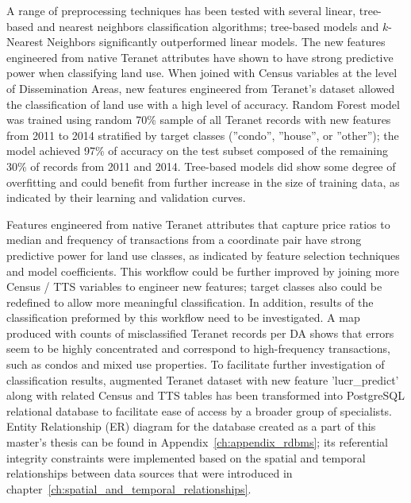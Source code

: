 A range of preprocessing techniques has been tested with several linear, tree-based and nearest neighbors classification algorithms;
tree-based models and $k$-Nearest Neighbors significantly outperformed linear models.
The new features engineered from native Teranet attributes have shown to have strong predictive power when classifying land use.
When joined with Census variables at the level of Dissemination Areas, new features engineered from Teranet's dataset allowed the classification of land use with a high level of accuracy.
Random Forest model was trained using random 70\% sample of all Teranet records with new features from 2011 to 2014 stratified by target classes (''condo'', ''house'', or ''other'');
the model achieved 97\% of accuracy on the test subset composed of the remaining 30\% of records from 2011 and 2014.
Tree-based models did show some degree of overfitting and could benefit from further increase in the size of training data, as indicated by their learning and validation curves.

Features engineered from native Teranet attributes that capture price ratios to median and frequency of transactions from a coordinate pair have strong predictive power for land use classes, as indicated by feature selection techniques and model coefficients.
This workflow could be further improved by joining more Census / TTS variables to engineer new features;
target classes also could be redefined to allow more meaningful classification.
In addition, results of the classification preformed by this workflow need to be investigated.
A map produced with counts of misclassified Teranet records per DA shows that errors seem to be highly concentrated and correspond to high-frequency transactions, such as condos and mixed use properties.
To facilitate further investigation of classification results, augmented Teranet dataset with new feature 'lucr\_predict' along with related Census and TTS tables has been transformed into PostgreSQL relational database to facilitate ease of access by a broader group of specialists.
Entity Relationship (ER) diagram for the database created as a part of this master's thesis can be found in Appendix~\ref{ch:appendix_rdbms};
its referential integrity constraints were implemented based on the spatial and temporal relationships between data sources that were introduced in chapter~\ref{ch:spatial_and_temporal_relationships}.
